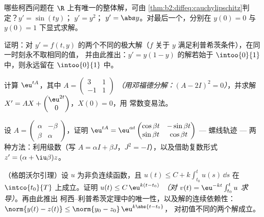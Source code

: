 \begin{exercise}[$\star$]\label{exo:b2:diffeq:2}
哪些柯西问题在 $\R$ 上有唯一的整体解，可由
\cref{thm:b2:diffeq:cauchylipschitz}判定？$y' = \sin(ty)$；$\;y' =
y^2$；$\;y' = \abs y$。对最后一个，分别在 $y(0) =
0$ 与 $y(0) = 1$ 下显式求解。
\end{exercise}

\begin{exercise}[$\star$]\label{exo:b2:diffeq:3}
证明：对 $y' = f(t,y)$ 的两个不同的极大解（$f$
关于 $y$ 满足利普希茨条件），在同一时刻永不取相同的值，
并由此推出：$y' = y(1 - y)$ 的解若始于
$\intoo{0}{1}$ 中，则永远留在 $\intoo{0}{1}$ 中。
\end{exercise}

\begin{exercise}[$\star\star$]\label{exo:b2:diffeq:4}
计算 $\eu^{tA}$，其中 $A = \begin{pmatrix} 3 & 1\\ -1 &
1\end{pmatrix}$ \emph{（用邓福德分解：$(A - 2I)^2 = 0$）}，并求解 $X' =
AX + \begin{pmatrix} \eu^{2t}\\ 0\end{pmatrix}$，$X(0) = 0$，用
常数变易法。
\end{exercise}

\begin{exercise}[$\star\star$]\label{exo:b2:diffeq:5}
设 $A = \begin{pmatrix} \alpha & -\beta\\ \beta &
\alpha\end{pmatrix}$，证明 $\eu^{tA} =
\eu^{\alpha t}\begin{pmatrix} \cos\beta t & -\sin\beta t\\
\sin\beta t & \cos\beta t\end{pmatrix}$ --- 螺线轨迹 ---
两种方法：利用级数（写 $A = \alpha I + \beta J$，$J^2 =
-I$），以及借助复数形式 $z' = (\alpha +
\iu\beta)z$。
\end{exercise}

\begin{exercise}[$\star\star$]\label{exo:b2:diffeq:6}
（格朗沃尔引理）设 $u$ 为非负连续函数，且 $u(t)
\leq C + k\int_{t_0}^{t} u(s)\,\dd s$ 在 $\intco{t_0}{T}$ 上成立。证明
$u(t) \leq C\,\eu^{k(t - t_0)}$ \emph{（对 $v(t) =
\eu^{-kt}\int_{t_0}^t u$ 求导）}。再由此推出
柯西--利普希茨定理中的唯一性，以及解的连续依赖性：$\norm{y(t) -
z(t)} \leq \norm{y_0 - z_0}\,\eu^{k\abs{t - t_0}}$，
对初值不同的两个解成立。
\end{exercise}

